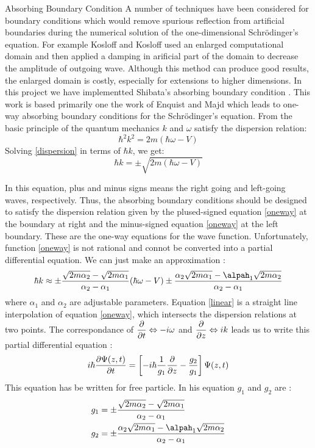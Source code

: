 \begin{homeworkProblem}
\begin{homeworkSection}{Absorbing Boundary Condition}
A number of techniques have been considered for boundary conditions which would remove spurious reflection from artificial boundaries during the numerical solution of the one-dimensional Schr\"odinger's equation. For example Kosloff and Kosloff \cite{kosloff} used an enlarged computational domain and then applied a damping in arificial part of the domain to decrease the amplitude of outgoing wave. Although this method can produce good results, the enlarged domain is costly, especially for extensions to higher dimensions. In this project we have implementted Shibata's absorbing boundary condition \cite{shibata}. This work is based primarily one the work of Enquist and Majd \cite{majd} which leads to one-way absorbing boundary conditions for the Schr\"odinger's equation. From the basic principle of the quantum mechanics $k$ and $\omega$ satisfy the dispersion relation:
\begin{equation}\label{dispersion}
\hbar^2k^2=2m\left( \hbar\omega-V\right)
\end{equation}
Solving \eqref{dispersion} in terms of $\hbar k$, we get:
\begin{equation}\label{oneway}
\hbar k=\pm\sqrt{2m(\hbar\omega -V)}
\end{equation}

In this equation, plus and minus signs means the right going and left-going waves, respectively. Thus, the absorbing boundary conditions should be designed to satisfy the dispersion relation given by the plused-signed equation \eqref{oneway} at the boundary at right and the minus-signed equation \eqref{oneway} at the left boundary. These are the one-way equations   for the wave function. Unfortunately, function \eqref{oneway} is not rational and connot be converted into a partial differential equation. We can just make an approximation \cite{shibata}:
\begin{equation}\label{linear}
\hbar k\approx\pm\frac{\sqrt{2m\alpha_2}-\sqrt{2m\alpha_1}}{\alpha_2-\alpha_1}(\hbar\omega-V)
\pm\frac{\alpha_2\sqrt{2m\alpha_1}-\alpah_1\sqrt{2m\alpha_2}}{\alpha_2-\alpha_1}
\end{equation}  
where $\alpha_1$ and $\alpha_2$ are adjustable parameters. Equation \eqref{linear} is a straight line interpolation of equation \eqref{oneway}, which intersects the dispersion relations at two points. The correspondance of $\dfrac{\partial}{\partial t}\Leftrightarrow-i\omega$ and $\dfrac{\partial}{\partial z}\Leftrightarrow ik$ leads us to write this partial differential equation \cite{shibata}:
\begin{equation}\label{P5-main}
i\hbar\dfrac{\partial \Psi(z,t)}{\partial t}=\left[-i\hbar\frac{1}{g_1}\dfrac{\partial}{\partial z}-\frac{g_2}{g_1}\right]\Psi(z,t)
\end{equation}  
This equation has be written for free particle. In his equation $g_1$ and $g_2$ are \cite{shibata}:
\begin{align}
&g_1=\pm\frac{\sqrt{2m\alpha_2}-\sqrt{2m\alpha_1}}{\alpha_2-\alpha_1}\\
&g_2=\pm\frac{\alpha_2\sqrt{2m\alpha_1}-\alpah_1\sqrt{2m\alpha_2}}{\alpha_2-\alpha_1}
\end{align} 


\end{homeworkSection}
\end{homeworkProblem}
